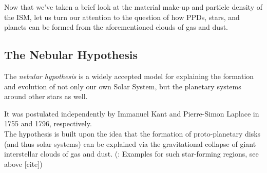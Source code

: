 
    Now that we've taken a brief look at the material make-up and particle density of the ISM, 
    let us turn our attention to the question of how PPDs, stars, and planets can be formed 
    from the aforementioned clouds of gas and dust.

\clearpage\subsection{The Nebular Hypothesis}

    The \textit{nebular hypothesis} is a widely accepted model for explaining the formation and 
    evolution of not only our own Solar System, but the planetary systems around other stars as 
    well. 

    It was postulated independently by Immanuel Kant        %
    and Pierre-Simon Laplace                                %
    in 1755 and 1796, respectively. \\                      %

    The hypothesis is built upon the idea that the formation of proto-planetary disks (and thus 
    solar systems) can be explained via the gravitational collapse of giant interstellar clouds 
    of gas and dust. (\todo: Examples for such star-forming regions, see above [cite]) \\

